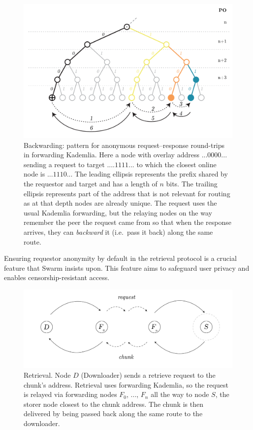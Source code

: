 \begin{figure}[htbp]
   \centering
   \includegraphics[width=\textwidth]{fig/request-response-forwarding.pdf}
   \caption[Backwarding: a pattern for anonymous request-response round-trips in forwarding Kademlia \statusgreen]{Backwarding: pattern for anonymous request--response round-trips in forwarding Kademlia. Here a node with overlay address $...0000...$ sending a request to target $....1111...$ to which the closest online node is $...1110...$ The leading ellipsis represents the prefix shared by the requestor and target and has a length of $n$ bits. The trailing ellipsis represents part of the address that is not relevant for routing as at that depth nodes are already unique. The request uses the usual Kademlia forwarding, but the relaying nodes on the way remember the peer the request came from so that when the response arrives, they can \emph{backward} it (i.e.\ pass it back) along the same route.}
   \label{fig:request-response}
\end{figure}

Ensuring requestor anonymity by default in the retrieval protocol is a crucial feature that Swarm insists upon. This feature aims to safeguard user privacy and enables censorship-resistant access.

\begin{figure}[htbp]
   \centering
   \includegraphics[width=\textwidth]{fig/retrieval.pdf}
   \caption[Retrieval \statusgreen]{Retrieval. Node $D$ (Downloader) sends a retrieve request to the chunk's address. Retrieval uses forwarding Kademlia, so the request is relayed via forwarding nodes $F_0$, ..., $F_n$ all the way to node $S$, the storer node closest to the chunk address. The chunk is then delivered by being passed back along the same route to the downloader.}
   \label{fig:retrieval}
\end{figure}

